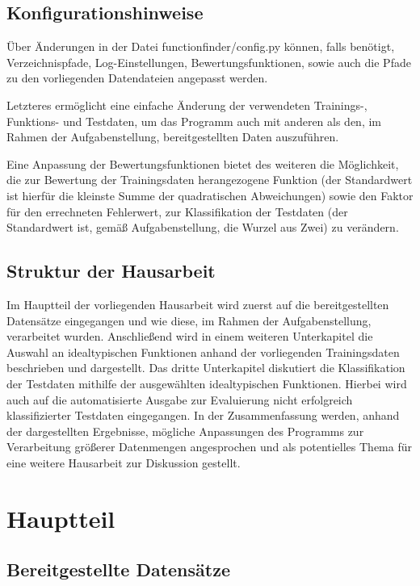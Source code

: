\section{Konfigurationshinweise}

Über Änderungen in der Datei functionfinder/config.py können, falls benötigt, Verzeichnispfade, Log-Einstellungen, Bewertungsfunktionen, sowie auch die Pfade zu den vorliegenden Datendateien angepasst werden.

Letzteres ermöglicht eine einfache Änderung der verwendeten Trainings-, Funktions- und Testdaten, um das Programm auch mit anderen als den, im Rahmen der Aufgabenstellung, bereitgestellten Daten auszuführen.

Eine Anpassung der Bewertungsfunktionen bietet des weiteren die Möglichkeit, die zur Bewertung der Trainingsdaten herangezogene Funktion (der Standardwert ist hierfür die kleinste Summe der quadratischen Abweichungen) sowie den Faktor für den errechneten Fehlerwert, zur Klassifikation der Testdaten (der Standardwert ist, gemäß Aufgabenstellung, die Wurzel aus Zwei) zu verändern.

\section{Struktur der Hausarbeit}

Im Hauptteil der vorliegenden Hausarbeit wird zuerst auf die bereitgestellten Datensätze eingegangen und wie diese, im Rahmen der Aufgabenstellung, verarbeitet wurden.
Anschließend wird in einem weiteren Unterkapitel die Auswahl an idealtypischen Funktionen anhand der vorliegenden Trainingsdaten beschrieben und dargestellt.
Das dritte Unterkapitel diskutiert die Klassifikation der Testdaten mithilfe der ausgewählten idealtypischen Funktionen. Hierbei wird auch auf die automatisierte Ausgabe zur Evaluierung nicht erfolgreich klassifizierter Testdaten eingegangen.
In der Zusammenfassung werden, anhand der dargestellten Ergebnisse, mögliche Anpassungen des Programms zur Verarbeitung größerer Datenmengen angesprochen und als potentielles Thema für eine weitere Hausarbeit zur Diskussion gestellt.

\chapter{Hauptteil}

\section{Bereitgestellte Datensätze}

